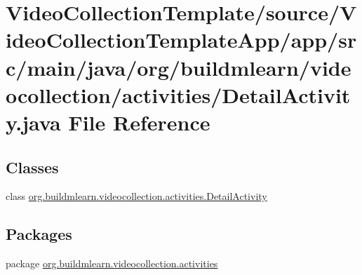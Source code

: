 \hypertarget{VideoCollectionTemplate_2source_2VideoCollectionTemplateApp_2app_2src_2main_2java_2org_2buildmlea928e2d82bf56507677eaff9646343d6}{}\section{Video\+Collection\+Template/source/\+Video\+Collection\+Template\+App/app/src/main/java/org/buildmlearn/videocollection/activities/\+Detail\+Activity.java File Reference}
\label{VideoCollectionTemplate_2source_2VideoCollectionTemplateApp_2app_2src_2main_2java_2org_2buildmlea928e2d82bf56507677eaff9646343d6}
\subsection*{Classes}
\begin{DoxyCompactItemize}
\item 
class \hyperlink{classorg_1_1buildmlearn_1_1videocollection_1_1activities_1_1DetailActivity}{org.\+buildmlearn.\+videocollection.\+activities.\+Detail\+Activity}
\end{DoxyCompactItemize}
\subsection*{Packages}
\begin{DoxyCompactItemize}
\item 
package \hyperlink{namespaceorg_1_1buildmlearn_1_1videocollection_1_1activities}{org.\+buildmlearn.\+videocollection.\+activities}
\end{DoxyCompactItemize}
